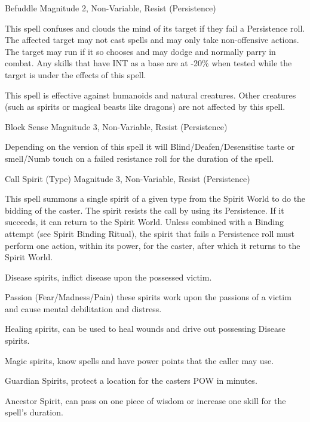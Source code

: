 \begin{rpg-spell}
{Befuddle}
{Magnitude 2, Non-Variable, Resist (Persistence)}

This spell confuses and clouds the mind of its target if they fail a Persistence roll. The affected target may not cast spells and may only take non-offensive actions. The target may run if it so chooses and may dodge and normally parry in combat. Any skills that have INT as a base are at -20\% when tested while the target is under the effects of this spell.

This spell is effective against humanoids and natural creatures. Other creatures (such as spirits or magical beasts like dragons) are not affected by this spell.
\end{rpg-spell}


\begin{rpg-spell}
{Block Sense}
{Magnitude 3, Non-Variable, Resist (Persistence)}

Depending on the version of this spell it will Blind/Deafen/Desensitise taste or smell/Numb touch on a failed resistance roll for the duration of the spell.
\end{rpg-spell}


\begin{rpg-spell}
{Call Spirit (Type)}
{Magnitude 3, Non-Variable, Resist (Persistence)}

This spell summons a single spirit of a given type from the Spirit World to do the bidding of the caster. The spirit resists the call by using its Persistence. If it succeeds, it can return to the Spirit World. Unless combined with a Binding attempt (see Spirit Binding Ritual), the spirit that fails a Persistence roll must perform one action, within its power, for the caster, after which it returns to the Spirit World.

\begin{rpg-list}
\item Disease spirits, inflict disease upon the possessed victim.
\item Passion (Fear/Madness/Pain) these spirits work upon the passions of a victim and cause mental debilitation and distress.
\item Healing spirits, can be used to heal wounds and drive out possessing Disease spirits.
\item Magic spirits, know spells and have power points that the caller may use.
\item Guardian Spirits, protect a location for the casters POW in minutes.
\item Ancestor Spirit, can pass on one piece of wisdom or increase one skill for the spell's duration.
\end{rpg-list}
\end{rpg-spell}

